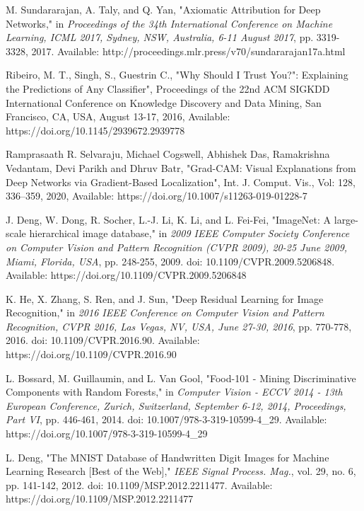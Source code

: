 \documentclass[conference]{IEEEtran}
\begin{document}
\begin{thebibliography}{00}
	
 M. Sundararajan, A. Taly, and Q. Yan, "Axiomatic Attribution for Deep Networks," in \textit{Proceedings of the 34th International Conference on Machine Learning, {ICML} 2017, Sydney, NSW, Australia, 6-11 August 2017}, pp. 3319-3328, 2017. Available: http://proceedings.mlr.press/v70/sundararajan17a.html
	
Ribeiro, M. T., Singh, S., Guestrin C., "Why Should {I} Trust You?": Explaining the Predictions of Any Classifier", Proceedings of the 22nd {ACM} {SIGKDD} International Conference on Knowledge Discovery and Data Mining, San Francisco, CA, USA, August
13-17, 2016, Available: https://doi.org/10.1145/2939672.2939778

Ramprasaath R. Selvaraju, Michael Cogswell, Abhishek Das, Ramakrishna Vedantam, Devi Parikh and Dhruv Batr, "Grad-CAM: Visual Explanations from Deep Networks via Gradient-Based Localization", Int. J. Comput. Vis., Vol: 128, 336--359, 2020, Available: https://doi.org/10.1007/s11263-019-01228-7

 J. Deng, W. Dong, R. Socher, L.-J. Li, K. Li, and L. Fei-Fei, "ImageNet: A large-scale hierarchical image database," in \textit{2009 IEEE Computer Society Conference on Computer Vision and Pattern Recognition (CVPR 2009), 20-25 June 2009, Miami, Florida, USA}, pp. 248-255, 2009. doi: 10.1109/CVPR.2009.5206848. Available: https://doi.org/10.1109/CVPR.2009.5206848

 K. He, X. Zhang, S. Ren, and J. Sun, "Deep Residual Learning for Image Recognition," in \textit{2016 IEEE Conference on Computer Vision and Pattern Recognition, CVPR 2016, Las Vegas, NV, USA, June 27-30, 2016}, pp. 770-778, 2016. doi: 10.1109/CVPR.2016.90. Available: https://doi.org/10.1109/CVPR.2016.90

 L. Bossard, M. Guillaumin, and L. Van Gool, "Food-101 - Mining Discriminative Components with Random Forests," in \textit{Computer Vision - ECCV 2014 - 13th European Conference, Zurich, Switzerland, September 6-12, 2014, Proceedings, Part VI}, pp. 446-461, 2014. doi: 10.1007/978-3-319-10599-4\_29. Available: https://doi.org/10.1007/978-3-319-10599-4\_29



L. Deng, "The {MNIST} Database of Handwritten Digit Images for Machine Learning Research [Best of the Web]," \textit{IEEE Signal Process. Mag.}, vol. 29, no. 6, pp. 141-142, 2012. doi: 10.1109/MSP.2012.2211477. Available: https://doi.org/10.1109/MSP.2012.2211477
	

\end{thebibliography}
\end{document}

